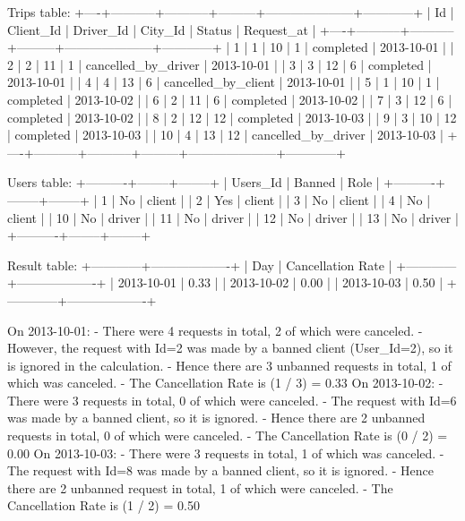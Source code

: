 \begin{Code}
Trips table:
+----+-----------+-----------+---------+---------------------+------------+
| Id | Client_Id | Driver_Id | City_Id | Status              | Request_at |
+----+-----------+-----------+---------+---------------------+------------+
| 1  | 1         | 10        | 1       | completed           | 2013-10-01 |
| 2  | 2         | 11        | 1       | cancelled_by_driver | 2013-10-01 |
| 3  | 3         | 12        | 6       | completed           | 2013-10-01 |
| 4  | 4         | 13        | 6       | cancelled_by_client | 2013-10-01 |
| 5  | 1         | 10        | 1       | completed           | 2013-10-02 |
| 6  | 2         | 11        | 6       | completed           | 2013-10-02 |
| 7  | 3         | 12        | 6       | completed           | 2013-10-02 |
| 8  | 2         | 12        | 12      | completed           | 2013-10-03 |
| 9  | 3         | 10        | 12      | completed           | 2013-10-03 |
| 10 | 4         | 13        | 12      | cancelled_by_driver | 2013-10-03 |
+----+-----------+-----------+---------+---------------------+------------+

Users table:
+----------+--------+--------+
| Users_Id | Banned | Role   |
+----------+--------+--------+
| 1        | No     | client |
| 2        | Yes    | client |
| 3        | No     | client |
| 4        | No     | client |
| 10       | No     | driver |
| 11       | No     | driver |
| 12       | No     | driver |
| 13       | No     | driver |
+----------+--------+--------+

Result table:
+------------+-------------------+
| Day        | Cancellation Rate |
+------------+-------------------+
| 2013-10-01 | 0.33              |
| 2013-10-02 | 0.00              |
| 2013-10-03 | 0.50              |
+------------+-------------------+

On 2013-10-01:
  - There were 4 requests in total, 2 of which were canceled.
  - However, the request with Id=2 was made by a banned client (User_Id=2), so it is ignored in the calculation.
  - Hence there are 3 unbanned requests in total, 1 of which was canceled.
  - The Cancellation Rate is (1 / 3) = 0.33
On 2013-10-02:
  - There were 3 requests in total, 0 of which were canceled.
  - The request with Id=6 was made by a banned client, so it is ignored.
  - Hence there are 2 unbanned requests in total, 0 of which were canceled.
  - The Cancellation Rate is (0 / 2) = 0.00
On 2013-10-03:
  - There were 3 requests in total, 1 of which was canceled.
  - The request with Id=8 was made by a banned client, so it is ignored.
  - Hence there are 2 unbanned request in total, 1 of which were canceled.
  - The Cancellation Rate is (1 / 2) = 0.50
\end{Code}

